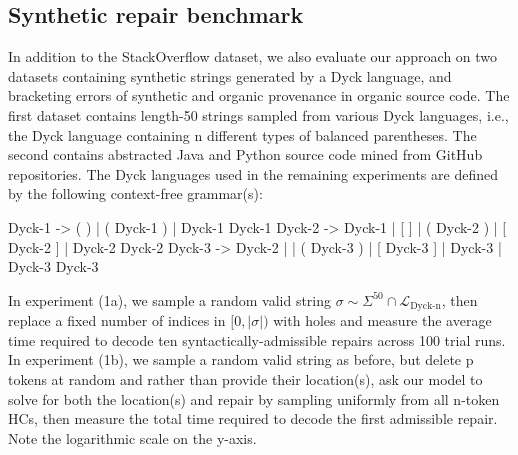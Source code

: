 \documentclass[sigplan,review,anonymous,acmsmall]{acmart}\settopmatter{printfolios=false,printccs=false,printacmref=false}
\begin{document}
\subsection{Synthetic repair benchmark}\label{sec:latency}

In addition to the StackOverflow dataset, we also evaluate our approach on two datasets containing synthetic strings generated by a Dyck language, and bracketing errors of synthetic and organic provenance in organic source code. The first dataset contains length-50 strings sampled from various Dyck languages, i.e., the Dyck language containing n different types of balanced parentheses. The second contains abstracted Java and Python source code mined from GitHub repositories. The Dyck languages used in the remaining experiments are defined by the following context-free grammar(s):

\begin{wholetidyinput}
Dyck-1 -> ( ) | ( Dyck-1 ) | Dyck-1 Dyck-1
Dyck-2 -> Dyck-1 | [ ] | ( Dyck-2 ) | [ Dyck-2 ] | Dyck-2 Dyck-2
Dyck-3 -> Dyck-2 | { } | ( Dyck-3 ) | [ Dyck-3 ] | { Dyck-3 } | Dyck-3 Dyck-3
\end{wholetidyinput}

\noindent In experiment (1a), we sample a random valid string $\sigma \sim \Sigma^{50} \cap \mathcal{L}_{\text{Dyck-n}}$, then replace a fixed number of indices in $[0, |\sigma|)$ with holes and measure the average time required to decode ten syntactically-admissible repairs across 100 trial runs. In experiment (1b), we sample a random valid string as before, but delete p tokens at random and rather than provide their location(s), ask our model to solve for both the location(s) and repair by sampling uniformly from all n-token HCs, then measure the total time required to decode the first admissible repair. Note the logarithmic scale on the y-axis.
\end{document}
